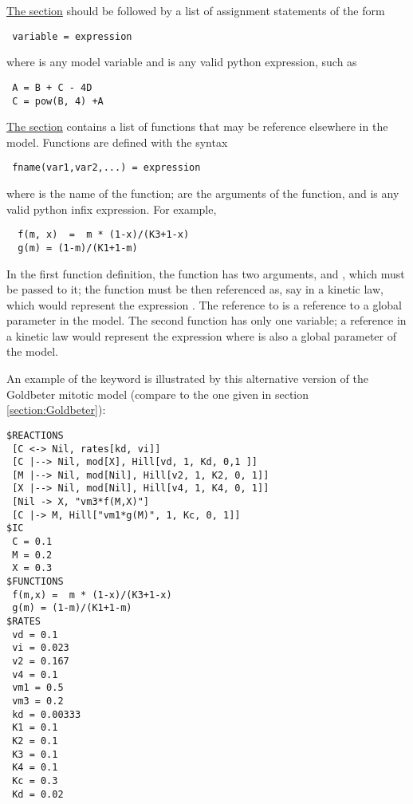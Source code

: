 \underline{The  section} should be followed by a list of assignment statements of the form 
\begin{lstlisting}
 variable = expression
\end{lstlisting}
where  is any model variable and  is any valid python expression, such as 
\begin{lstlisting}
 A = B + C - 4D
 C = pow(B, 4) +A
\end{lstlisting}
\underline{The  section} contains a list of functions that may be reference elsewhere in the model. Functions are defined with the syntax
\begin{lstlisting}
 fname(var1,var2,...) = expression
\end{lstlisting}
where  is the name of the function;  are the arguments of the function, and  is any valid python infix expression. For example, 
\begin{lstlisting}
  f(m, x)  =  m * (1-x)/(K3+1-x)
  g(m) = (1-m)/(K1+1-m)
\end{lstlisting}
In the first function definition, the function has two arguments,  and , which must be passed to it; the function must be then referenced as, say  in a kinetic law, which would represent the expression . The reference to  is a reference to a global parameter in the model. The second function has only one variable; a reference  in a kinetic law would represent the expression  where  is also a global parameter of the model. 

An example of the  keyword is illustrated by this alternative version of the Goldbeter mitotic model (compare to the one given in section \ref{section:Goldbeter}): 

\begin{lstlisting}
$REACTIONS
 [C <-> Nil, rates[kd, vi]]
 [C |--> Nil, mod[X], Hill[vd, 1, Kd, 0,1 ]]
 [M |--> Nil, mod[Nil], Hill[v2, 1, K2, 0, 1]]
 [X |--> Nil, mod[Nil], Hill[v4, 1, K4, 0, 1]]
 [Nil -> X, "vm3*f(M,X)"]
 [C |-> M, Hill["vm1*g(M)", 1, Kc, 0, 1]]
$IC
 C = 0.1
 M = 0.2
 X = 0.3
$FUNCTIONS
 f(m,x) =  m * (1-x)/(K3+1-x)
 g(m) = (1-m)/(K1+1-m)
$RATES
 vd = 0.1
 vi = 0.023
 v2 = 0.167
 v4 = 0.1
 vm1 = 0.5
 vm3 = 0.2
 kd = 0.00333
 K1 = 0.1
 K2 = 0.1
 K3 = 0.1
 K4 = 0.1
 Kc = 0.3
 Kd = 0.02
\end{lstlisting}


